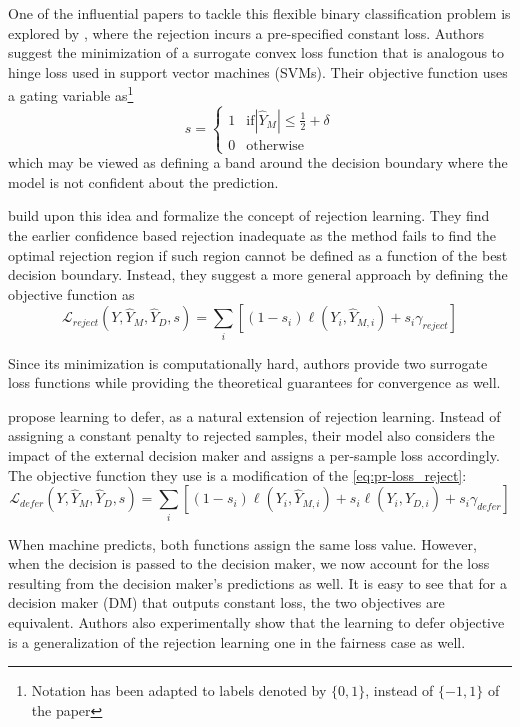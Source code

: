 \documentclass[11pt,a4paper,final]{article}
\begin{document}
One of the influential papers to tackle this flexible binary classification problem is explored by  \citet{bartlett2008classification}, where the rejection incurs a pre-specified constant loss. Authors suggest the minimization of a surrogate convex loss function that is analogous to hinge loss used in support vector machines (SVMs). Their objective function uses a gating variable as\footnote{Notation has been adapted to labels denoted by $\{0,1\}$, instead of $\{-1,1\}$ of the paper}
\begin{equation}
s = 
\begin{cases} 
  1 & \text{if} |\hat{Y}_{M}| \leq \frac{1}{2} + \delta \\
  0 & \text{otherwise} 
\end{cases}
\end{equation}
which may be viewed as defining a band around the decision boundary where the model is not confident about the prediction.

\citet{cortes2016learning} build upon this idea and formalize the concept of rejection learning. They find the earlier confidence based rejection inadequate as the method fails to find the optimal rejection region if such region cannot be defined as a function of the best decision boundary. Instead, they suggest a more general approach by defining the objective function as
\begin{equation}\label{eq:pr-loss_reject}
    \mathcal{L}_{reject}(Y,\hat{Y}_M, \hat{Y}_D, s) = \sum\limits_i [(1-s_i) \ell(Y_i, \hat{Y}_{M,i}) + s_i \gamma_{reject}]
\end{equation}
\par Since its minimization is computationally hard, authors provide two surrogate loss functions while providing the theoretical guarantees for convergence as well.

\citet{madras2018predict} propose learning to defer, as a natural extension of rejection learning. Instead of assigning a constant penalty to rejected samples, their model also considers the impact of the external decision maker and assigns a per-sample loss accordingly. The objective function they use is a modification of the \eqref{eq:pr-loss_reject}:
\begin{equation}\label{eq:pr-loss_defer}
    \mathcal{L}_{defer}(Y,\hat{Y}_M, \hat{Y}_D, s) =  \sum\limits_i [(1-s_i) \ell(Y_i, \hat{Y}_{M,i}) + s_i \ell(Y_i, \hat{Y}_{D,i}) + s_i \gamma_{defer}]
\end{equation}
\par When machine predicts, both functions assign the same loss value. However, when the decision is passed to the decision maker, we now account for the loss resulting from the decision maker's predictions as well. It is easy to see that for a decision maker (DM) that outputs constant loss, the two objectives are equivalent. Authors also experimentally show that the learning to defer objective is a generalization of the rejection learning one in the fairness case as well.
\end{document}

